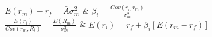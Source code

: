 $E(r_{m}) - r_{f} = \bar{A}\sigma^{2}_{m}$ & $\beta_{i} =  \frac{Cov(r_{i}, r_{m})}{\sigma^{2}_{m}}$ \\

$\frac{E(r_{i})}{Cov(r_{m}, R_{i})} = \frac{E(R_{m})}{\sigma^{2}_{m}}$ & $E(r_{i}) = r_{f} + \beta_{i}\left[E(r_{m} - r_{f})\right]$ \\



